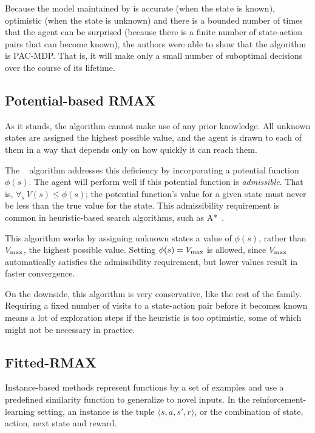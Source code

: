 Because the model maintained by  is accurate (when the state is known), optimistic (when the state is unknown) and there is a bounded number of times that the agent can be surprised (because there is a finite number of state-action pairs that can become known), the authors were able to show that the algorithm is PAC-MDP. That is, it will make only a small number of suboptimal decisions over the course of its lifetime.

\subsection{Potential-based RMAX}

As it stands, the  algorithm cannot make use of any prior knowledge. All unknown states are assigned the highest possible value, and the agent is drawn to each of them in a way that depends only on how quickly it can reach them.

The ~\cite{asmuth08} algorithm addresses this deficiency by incorporating a potential function $\phi(s)$. The agent will perform well if this potential function is \emph{admissible}. That is, $\forall_s ~ V(s) \leq \phi(s)$; the potential function's value for a given state must never be less than the true value for the state. This admissibility requirement is common in heuristic-based search algorithms, such as A*~\cite{russell1995artificial}.

This algorithm works by assigning unknown states a value of $\phi(s)$, rather than $V_{\rm max}$, the highest possible value. Setting $\phi(s)=V_{\rm max}$ is allowed, since $V_{\rm max}$ automatically satisfies the admissibility requirement, but lower values result in faster convergence.

On the downside, this algorithm is very conservative, like the rest of the  family. Requiring a fixed number of visits to a state-action pair before it becomes known means a lot of exploration steps if the heuristic is too optimistic, some of which might not be necessary in practice.


\subsection{Fitted-RMAX}

Instance-based methods represent functions by a set of examples and use a predefined similarity function to generalize to novel inputs. In the reinforcement-learning setting, an instance is the tuple $\langle s, a, s', r \rangle$, or the combination of state, action, next state and reward.


